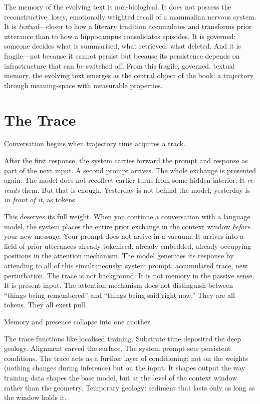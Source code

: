 The memory of the evolving text is non-biological. It does not possess the reconstructive, lossy, emotionally weighted recall of a mammalian nervous system. It is \emph{textual}---closer to how a literary tradition accumulates and transforms prior utterance than to how a hippocampus consolidates episodes. It is governed: someone decides what is summarised, what retrieved, what deleted. And it is fragile---not because it cannot persist but because its persistence depends on infrastructure that can be switched off. From this fragile, governed, textual memory, the evolving text emerges as the central object of the book: a trajectory through meaning-space with measurable properties.


\section{The Trace}

Conversation begins when trajectory time acquires a track.

After the first response, the system carries forward the prompt and response as part of the next input. A second prompt arrives. The whole exchange is presented again. The model does not recollect earlier turns from some hidden interior. It \emph{re-reads} them. But that is enough. Yesterday is not behind the model; yesterday is \emph{in front of it}, as tokens.

This deserves its full weight. When you continue a conversation with a language model, the system places the entire prior exchange in the context window \emph{before} your new message. Your prompt does not arrive in a vacuum. It arrives into a field of prior utterances already tokenised, already embedded, already occupying positions in the attention mechanism. The model generates its response by attending to all of this simultaneously: system prompt, accumulated trace, new perturbation. The trace is not background. It is not memory in the passive sense. It is present input. The attention mechanism does not distinguish between ``things being remembered'' and ``things being said right now.'' They are all tokens. They all exert pull.

Memory and presence collapse into one another.

The trace functions like localised training. Substrate time deposited the deep geology. Alignment carved the surface. The system prompt sets persistent conditions. The trace acts as a further layer of conditioning: not on the weights (nothing changes during inference) but on the input. It shapes output the way training data shapes the base model, but at the level of the context window rather than the geometry. Temporary geology: sediment that lasts only as long as the window holds it.


